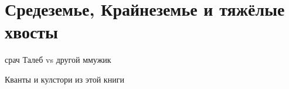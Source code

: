 \documentclass[12pt, a4paper, oneside]{article}
\begin{document}
\section{Средеземье, Крайнеземье и тяжёлые хвосты}

срач Талеб vs другой ммужик

Кванты и кулстори из этой книги 


\end{document}
